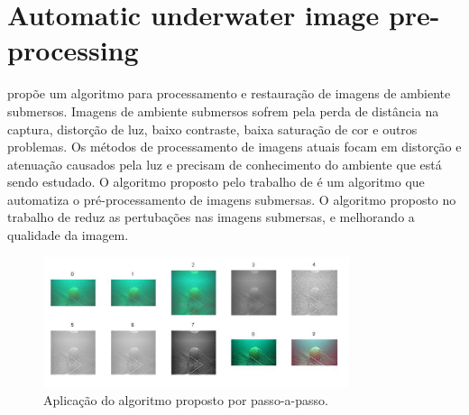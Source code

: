 
\section{Automatic underwater image pre-processing}

 propõe um algoritmo para processamento e restauração de imagens de ambiente submersos.  Imagens de ambiente submersos sofrem pela perda de distância na captura, distorção de luz, baixo contraste, baixa saturação de cor e outros problemas. Os métodos de processamento de imagens atuais focam em distorção e atenuação causados pela luz e precisam de conhecimento do ambiente que está sendo estudado. O algoritmo proposto pelo trabalho de  é um algoritmo que automatiza o pré-processamento de imagens submersas. O algoritmo proposto no trabalho de  reduz as pertubações nas imagens submersas, e melhorando a qualidade da imagem.


\begin{figure}[h]
	\caption{\label{fig:bazeillemetod}Aplicação do algoritmo proposto por \cite{bazeille2006} passo-a-passo.}
	\begin{center}
	    \includegraphics[width=0.8\textwidth]{resources/bazeilemetod}
	\end{center}
\end{figure}

